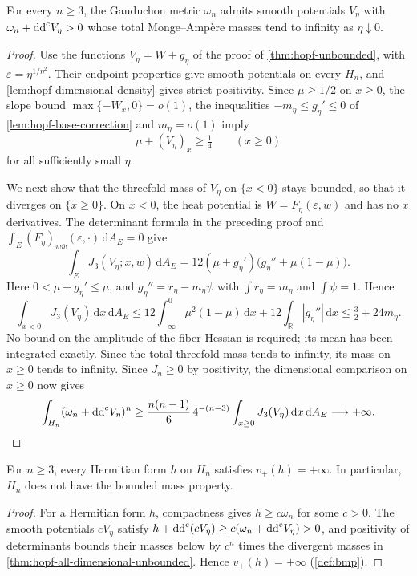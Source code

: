 \begin{theorem}\label{thm:hopf-all-dimensional-unbounded}
For every $n\geq3$, the Gauduchon metric $\omega_n$ admits smooth potentials $V_\eta$ with $\omega_n+\mathrm{dd}^{\mathrm{c}} V_\eta>0$ whose total Monge--Amp\`ere masses tend to infinity as $\eta\downarrow0$.
\end{theorem}
\begin{proof}
Use the functions $V_\eta=W+g_\eta$ of the proof of \cref{thm:hopf-unbounded}, with $\varepsilon=\eta^{1/\eta^2}$. Their endpoint properties give smooth potentials on every $H_n$, and \cref{lem:hopf-dimensional-density} gives strict positivity. Since $\mu\geq1/2$ on $x\geq0$, the slope bound $\max\{-W_x,0\}=o(1)$, the inequalities $-m_\eta\leq g_\eta'\leq0$ of \cref{lem:hopf-base-correction} and $m_\eta=o(1)$ imply
\[
 \mu+(V_\eta)_x\geq\tfrac14
 \qquad(x\geq0)
\]
for all sufficiently small $\eta$.

We next show that the threefold mass of $V_\eta$ on $\{x<0\}$ stays bounded, so that it diverges on $\{x\geq0\}$. On $x<0$, the heat potential is $W=F_\eta(\varepsilon,w)$ and has no $x$ derivatives. The determinant formula in the preceding proof and $\int_E(F_\eta)_{w\bar w}(\varepsilon,\cdot)\,\mathrm dA_E=0$ give
\[
 \int_E J_3(V_\eta;x,w)\,\mathrm dA_E
 =12(\mu+g_\eta')
                \bigl(g_\eta''+\mu(1-\mu)\bigr).
\]
Here $0<\mu+g_\eta'\leq\mu$, and
$g_\eta''=r_\eta-m_\eta\psi$ with
$\int r_\eta=m_\eta$ and $\int\psi=1$. Hence
\[
 \int_{x<0}\!J_3(V_\eta)\,\mathrm dx\,\mathrm dA_E
 \leq12\int_{-\infty}^0\mu^2(1-\mu)\,\mathrm dx
       +12\int_{\mathbb R}|g_\eta''|\,\mathrm dx
 \leq\tfrac32+24m_\eta.
\]
No bound on the amplitude of the fiber Hessian is required; its mean has been integrated exactly. Since the total threefold mass tends to infinity, its mass on $x\geq0$ tends to infinity. Since $J_n\geq0$ by positivity, the dimensional comparison on $x\geq0$ now gives
\[
 \int_{H_n}(\omega_n+\mathrm{dd}^{\mathrm{c}} V_\eta)^n
 \geq\frac{n(n-1)}6\,4^{-(n-3)}
       \int_{x\geq0}J_3(V_\eta)\,\mathrm dx\,\mathrm dA_E
 \longrightarrow+\infty.
\]
\end{proof}

\begin{corollary}\label{cor:hopf-all-metrics-unbounded}
For $n\geq3$, every Hermitian form $h$ on $H_n$ satisfies $v_+(h)=+\infty$. In particular, $H_n$ does not have the bounded mass property.
\end{corollary}
\begin{proof}
For a Hermitian form $h$, compactness gives $h\geq c\omega_n$ for some $c>0$. The smooth potentials $cV_\eta$ satisfy
$h+\mathrm{dd}^{\mathrm{c}}(cV_\eta)\geq c(\omega_n+\mathrm{dd}^{\mathrm{c}} V_\eta)>0$,
and positivity of determinants bounds their masses below by $c^n$ times the divergent masses in \cref{thm:hopf-all-dimensional-unbounded}. Hence $v_+(h)=+\infty$ (\cref{def:bmp}).
\end{proof}
